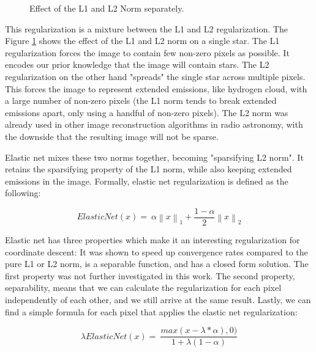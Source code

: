 \begin{figure}[h]
	\caption{Effect of the L1 and L2 Norm separately.}
	\label{cd:elastic}
\end{figure}


This regularization is a mixture between the L1 and L2 regularization. The Figure \ref{cd:elastic} shows the effect of the L1 and L2 norm on a single star. The L1 regularization forces the image to contain few non-zero pixels as possible. It encodes our prior knowledge that the image will contain stars. The L2 regularization on the other hand "spreads" the single star across multiple pixels. This forces the image to represent extended emissions, like hydrogen cloud, with a large number of non-zero pixels (the L1 norm tends to break extended emissions apart, only using a handful of non-zero pixels). The L2 norm was already used in other image reconstruction algorithms in radio astronomy\cite{ferrari2014distributed}, with the downside that the resulting image will not be sparse.

Elastic net mixes these two norms together, becoming "sparsifying L2 norm". It retains the sparsifying property of the L1 norm, while also keeping extended emissions in the image. Formally, elastic net regularization is defined as the following:

\begin{equation}\label{cd:elastic:formula}
ElasticNet(x) = \: \alpha \left \|x \right \|_1 + \frac{1-\alpha}{2}  \left \|x \right \|_2
\end{equation}

Elastic net has three properties which make it an interesting regularization for coordinate descent: It was shown to speed up convergence rates compared to the pure L1 or L2 norm\cite{friedman2010regularization}, is a separable function, and has a closed form solution. The first property was not further investigated in this work. The second property, separability, means that we can calculate the regularization for each pixel independently of each other, and we still arrive at the same result. Lastly, we can find a simple formula for each pixel that applies the elastic net regularization:

\begin{equation}\label{cd:elastic:closed}
\lambda ElasticNet(x) = \: \frac{max(x - \lambda * \alpha), 0)}{1+\lambda(1 - \alpha)}
\end{equation}




